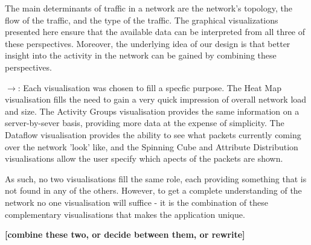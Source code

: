 The main determinants of traffic in a network are the network's topology, the flow of the traffic, and the type of the traffic. The graphical visualizations presented here ensure that the available data can be interpreted from all three of these perspectives. Moreover, the underlying idea of our design is that better insight into the activity in the network can be gained by combining these perspectives.

$\to$: Each visualisation was chosen to fill a specfic purpose.  The Heat Map visualisation fills the need to gain a very quick impression of overall network load and size.  The Activity Groups visualisation provides the same information on a server-by-sever basis, providing more data at the expense of simplicity.  The Dataflow visualisation provides the ability to see what packets currently coming over the network 'look' like, and the Spinning Cube and Attribute Distribution visualisations allow the user specify which apects of the packets are shown.

As such, no two visualisations fill the same role, each providing something that is not found in any of the others.  However, to get a complete understanding of the network no one visualisation will suffice - it is the combination of these complementary visualisations that makes the application unique.

\textbf{[combine these two, or decide between them, or rewrite]}